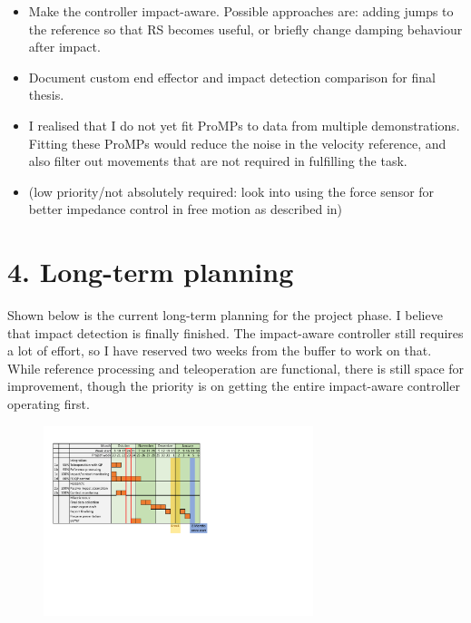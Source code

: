 \documentclass[11pt]{report}
\numberwithin{equation}{section}        %
\numberwithin{figure}{section}          %
\numberwithin{table}{section}           %
\begin{document}
  \begin{itemize}
      \item Make the controller impact-aware. Possible approaches are: adding jumps to the reference so that RS becomes useful, or briefly change damping behaviour after impact.
      \item Document custom end effector and impact detection comparison for final thesis.
      \item I realised that I do not yet fit ProMPs to data from multiple demonstrations. Fitting these ProMPs would reduce the noise in the velocity reference, and also filter out movements that are not required in fulfilling the task.
      \item (low priority/not absolutely required: look into using the force sensor for better impedance control in free motion as described in)
  \end{itemize}

  \section*{4. Long-term planning}
  Shown below is the current long-term planning for the project phase.  I believe that impact detection is finally finished. The impact-aware controller still requires a lot of effort, so I have reserved two weeks from the buffer to work on that. While reference processing and teleoperation are functional, there is still space for improvement, though the priority is on getting the entire impact-aware controller operating first. 

  \begin{figure}[H]
  \centering
  \includegraphics[width=0.7\textwidth, trim={0.87cm 9.5cm 10cm 1.5cm},clip]{Graphics/planning v2.pdf}

  \label{fig:my_label}
  \end{figure}
\end{document}
